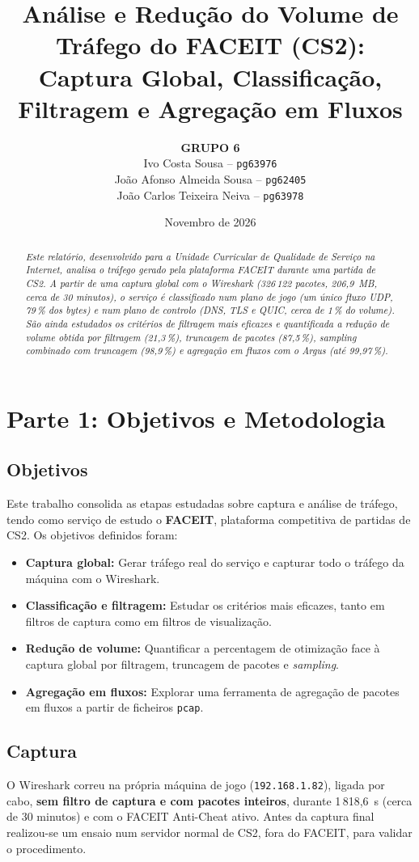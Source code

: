 \documentclass[11pt, a4paper]{article}
\title{\textbf{Análise e Redução do Volume de Tráfego do FACEIT (CS2): Captura Global, Classificação, Filtragem e Agregação em Fluxos}}
\author{
  \textbf{GRUPO 6} \\[0.4cm]
  Ivo Costa Sousa -- \texttt{pg63976} \\[0.15cm]
  João Afonso Almeida Sousa -- \texttt{pg62405} \\[0.15cm]
  João Carlos Teixeira Neiva -- \texttt{pg63978} \\[0.15cm]
}
\date{Novembro de 2026}
\begin{document}
\maketitle

\begin{abstract}
\textit{Este relatório, desenvolvido para a Unidade Curricular de Qualidade de Serviço na Internet, analisa o tráfego gerado pela plataforma FACEIT durante uma partida de CS2. A partir de uma captura global com o Wireshark (326\,122 pacotes, 206,9~MB, cerca de 30 minutos), o serviço é classificado num plano de jogo (um único fluxo UDP, 79\,\% dos bytes) e num plano de controlo (DNS, TLS e QUIC, cerca de 1\,\% do volume). São ainda estudados os critérios de filtragem mais eficazes e quantificada a redução de volume obtida por filtragem (21,3\,\%), truncagem de pacotes (87,5\,\%), \emph{sampling} combinado com truncagem (98,9\,\%) e agregação em fluxos com o Argus (até 99,97\,\%).}
\end{abstract}

\section{Parte 1: Objetivos e Metodologia}

\subsection{Objetivos}
Este trabalho consolida as etapas estudadas sobre captura e análise de tráfego, tendo como serviço de estudo o \textbf{FACEIT}, plataforma competitiva de partidas de CS2. Os objetivos definidos foram:
\begin{itemize}
    \item \textbf{Captura global:} Gerar tráfego real do serviço e capturar todo o tráfego da máquina com o Wireshark.
    \item \textbf{Classificação e filtragem:} Estudar os critérios mais eficazes, tanto em filtros de captura como em filtros de visualização.
    \item \textbf{Redução de volume:} Quantificar a percentagem de otimização face à captura global por filtragem, truncagem de pacotes e \textit{sampling}.
    \item \textbf{Agregação em fluxos:} Explorar uma ferramenta de agregação de pacotes em fluxos a partir de ficheiros \texttt{pcap}.
\end{itemize}

\subsection{Captura}
O Wireshark correu na própria máquina de jogo (\texttt{192.168.1.82}), ligada por cabo, \textbf{sem filtro de captura e com pacotes inteiros}, durante 1\,818,6~s (cerca de 30 minutos) e com o FACEIT Anti-Cheat ativo. Antes da captura final realizou-se um ensaio num servidor normal de CS2, fora do FACEIT, para validar o procedimento.
\end{document}
